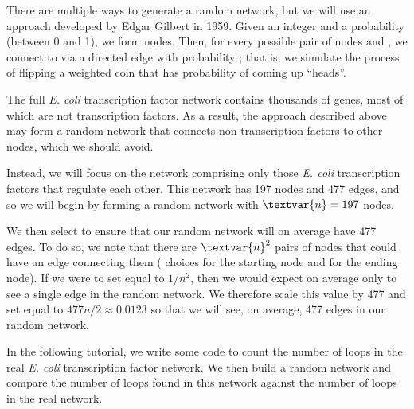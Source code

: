 There are multiple ways to generate a random network, but we will use an approach developed by Edgar Gilbert in 1959. Given an integer  and a probability  (between 0 and 1), we form  nodes. Then, for every possible pair of nodes  and , we connect  to  via a directed edge with probability ; that is, we simulate the process of flipping a weighted coin that has probability  of coming up ``heads''.\\

\begin{note}\end{note}

\fudgespace

\begin{qbox}\end{qbox} 

The full \textit{E. coli} transcription factor network contains thousands of genes, most of which are not transcription factors. As a result, the approach described above may form a random network that connects non-transcription factors to other nodes, which we should avoid.

Instead, we will focus on the network comprising only those \textit{E. coli} transcription factors that regulate each other. This network has 197 nodes and 477 edges, and so we will begin by forming a random network with $\textvar{n} = 197$ nodes.

We then select  to ensure that our random network will on average have 477 edges. To do so, we note that there are $\textvar{n}^2$ pairs of nodes that could have an edge connecting them ( choices for the starting node and  for the ending node). If we were to set  equal to $1/n^2$, then we would expect on average only to see a single edge in the random network. We therefore scale this value by 477 and set  equal to $477n/2 \approx 0.0123$ so that we will see, on average, 477 edges in our random network.

In the following tutorial, we write some code to count the number of loops in the real \textit{E. coli} transcription factor network. We then build a random network and compare the number of loops found in this network against the number of loops in the real network.

